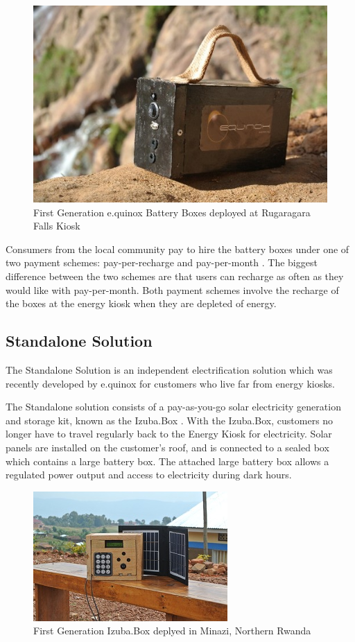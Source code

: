\begin{figure}[h!]
\centering
\includegraphics[scale=0.5]{Images/AmaziBox.jpg}
\caption{First Generation e.quinox Battery Boxes deployed at Rugaragara Falls Kiosk}
\label{fig:AmaziBox}
\end{figure}

Consumers from the local community pay to hire the battery boxes under one of two payment schemes: pay-per-recharge and pay-per-month \cite{e.quinox-Hydro-web:2012}. The biggest difference between the two schemes are that users can recharge as often as they would like with pay-per-month. Both payment schemes involve the recharge of the boxes at the energy kiosk when they are depleted of energy.

\subsection*{Standalone Solution}
The Standalone Solution is an independent electrification solution which was recently developed by e.quinox for customers who live far from energy kiosks.

The Standalone solution consists of a pay-as-you-go solar electricity generation and storage kit, known as the Izuba.Box \cite{e.quinox-Standalone-web:2012}.  With the Izuba.Box, customers no longer have to travel regularly back to the Energy Kiosk for electricity. Solar panels are installed on the customer's roof, and is connected to a sealed box which contains a large battery box. The attached large battery box allows a regulated power output and access to electricity during dark hours. 

\begin{figure}[h!]
\centering
\includegraphics[scale=3]{Images/standalone_box.jpg}
\caption{First Generation Izuba.Box deplyed in Minazi, Northern Rwanda}
\label{fig:IzubaBox}
\end{figure}

